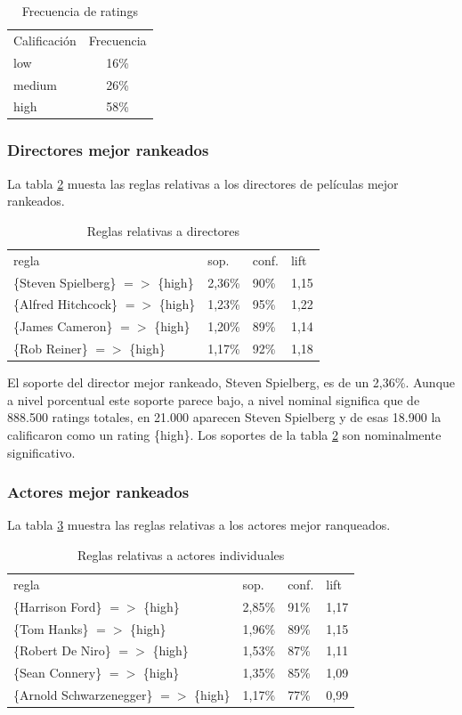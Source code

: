 \documentclass[journal]{IEEEtran}
\begin{document}
\begin{table}[ht!]
\caption{Frecuencia de ratings}
\label{rating_freq}
\centering
\begin{tabular}{l c}
Calificación & Frecuencia \\
low &  16\% \\
medium & 26\% \\
high & 58\%
\end{tabular}
\end{table}

\subsubsection{Directores mejor rankeados}
La tabla \ref{table_best_directors} muesta las reglas relativas a los 
directores de películas mejor rankeados.
\begin{table}[ht!]
\caption{Reglas relativas a directores}
\label{table_best_directors}
\centering
\begin{tabular}{l l l l }
regla & sop. & conf. & lift \\
\{Steven Spielberg\} $=$$>$ \{high\} & 2,36\% & 90\% & 1,15 \\
\{Alfred Hitchcock\} $=$$>$ \{high\} & 1,23\% & 95\% & 1,22 \\
\{James Cameron\} $=$$>$ \{high\} & 1,20\% & 89\% & 1,14 \\
\{Rob Reiner\} $=$$>$ \{high\} & 1,17\% & 92\% & 1,18
\end{tabular}
\end{table}

El soporte del director mejor rankeado, Steven Spielberg, es de un 2,36\%. Aunque a nivel
porcentual este soporte parece bajo, a nivel nominal significa que de 888.500 ratings
totales, en 21.000 aparecen Steven Spielberg y de esas 18.900 la calificaron como un
rating \{high\}. Los soportes de la tabla \ref{table_best_directors} 
son nominalmente significativo. 

\subsubsection{Actores mejor rankeados}
La tabla \ref{table_best_cast}   muestra las reglas relativas a los actores 
mejor ranqueados.
\begin{table}[ht!]
\caption{Reglas relativas a actores individuales}
\label{table_best_cast}
\centering
\begin{tabular}{l l l l }
regla & sop. & conf. & lift \\
\{Harrison Ford\} $=$$>$ \{high\} & 2,85\% & 91\% & 1,17 \\
\{Tom Hanks\} $=$$>$ \{high\} & 1,96\% & 89\% & 1,15 \\
\{Robert De Niro\} $=$$>$ \{high\} & 1,53\% & 87\% & 1,11 \\
\{Sean Connery\} $=$$>$ \{high\} & 1,35\% & 85\% & 1,09 \\
\{Arnold Schwarzenegger\} $=$$>$ \{high\} & 1,17\% & 77\% & 0,99
\end{tabular}
\end{table}
\end{document}
